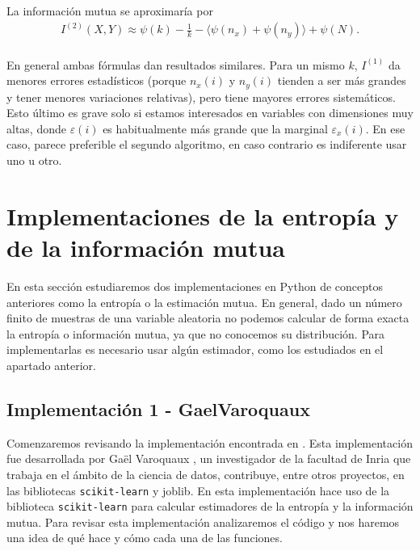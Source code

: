 \documentclass[12pt,a4paper]{report} %
\theoremstyle{definition}
\begin{document}
La información mutua se aproximaría por
\begin{align}
I^{(2)}(X,Y) \approx \psi(k) - \frac{1}{k} - \langle \psi(n_x) + \psi(n_y) \rangle + \psi(N). \label{eq:est2}
\end{align}\\[-10pt]


En general ambas fórmulas dan resultados similares. Para un mismo $k$, $I^{(1)}$ da menores errores estadísticos (porque $n_x(i)$ y $n_y(i)$ tienden a ser más grandes y tener menores variaciones relativas), pero tiene mayores errores sistemáticos. Esto último es grave solo si estamos interesados en variables con dimensiones muy altas, donde $\varepsilon(i)$ es habitualmente más grande que la marginal $\varepsilon_x(i)$. En ese caso, parece preferible el segundo algoritmo, en caso contrario es indiferente usar uno u otro.\\

\section{Implementaciones de la entropía y de la información mutua}

En esta sección estudiaremos dos implementaciones en Python de conceptos anteriores como la entropía o la estimación mutua. En general, dado un número finito de muestras de una variable aleatoria no podemos calcular de forma exacta la entropía o información mutua, ya que no conocemos su distribución. Para implementarlas es necesario usar algún estimador, como los estudiados en el apartado anterior.

\subsection{Implementación 1 - GaelVaroquaux}

Comenzaremos revisando la implementación encontrada en \cite{estimating}. Esta implementación fue desarrollada por Gaël Varoquaux \cite{gael-varoquaux}, un investigador de la facultad de Inria que trabaja en el ámbito de la ciencia de datos, contribuye, entre otros proyectos, en las bibliotecas \texttt{scikit-learn} y joblib. En esta implementación hace uso de la biblioteca \texttt{scikit-learn} para calcular estimadores de la entropía y la información mutua. Para revisar esta implementación analizaremos el código y nos haremos una idea de qué hace y cómo cada una de las funciones.
\end{document}
